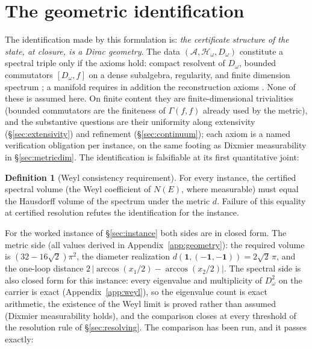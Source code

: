 \documentclass[11pt]{article}
\theoremstyle{definition}
\newtheorem{definition}[theorem]{Definition}
\theoremstyle{remark}
\newcommand{\A}{\mathcal{A}}
\newcommand{\Hw}{\mathcal{H}_{\omega}}
\begin{document}
\section{The geometric identification}\label{sec:geometry}

The identification made by this formulation is: \emph{the certificate
structure of the state, at closure, is a Dirac geometry}.  The data
$(\A, \Hw, D_\omega)$ constitute a spectral triple only if the axioms
hold: compact resolvent of $D_\omega$, bounded commutators $[D_\omega,
f]$ on a dense subalgebra, regularity, and finite dimension spectrum
\cite{connes}; a manifold requires in addition the reconstruction axioms
\cite{connesrecon}.  None of these is assumed here.  On finite content
they are finite-dimensional trivialities (bounded commutators are the
finiteness of $\Gamma(f,f)$ already used by the metric), and the
substantive questions are their uniformity along extensivity
(\S\ref{sec:extensivity}) and refinement (\S\ref{sec:continuum}); each
axiom is a named verification obligation per instance, on the same
footing as Dixmier measurability in \S\ref{sec:metricdim}.  The
identification is falsifiable at its first quantitative joint:

\begin{definition}[Weyl consistency requirement]\label{def:weyl}
For every instance, the certified spectral volume (the Weyl coefficient
of $N(E)$, where measurable) must equal the Hausdorff volume of the
spectrum under the metric $d$.  Failure of this equality at certified
resolution refutes the identification for the instance.
\end{definition}

For the worked instance of \S\ref{sec:instance} both sides are in
closed form.  The metric side (all values derived in
Appendix~\ref{app:geometry}): the required volume is
$(32 - 16\sqrt 2)\pi^2$, the diameter
realization $d(\mathbf 1, (-\mathbf 1,-\mathbf 1)) = 2\sqrt2\,\pi$, and
the one-loop distance $2\,|\arccos(x_1/2) - \arccos(x_2/2)|$.  The
spectral side is also closed form for this instance: every eigenvalue
and multiplicity of $D_\omega^2$ on the carrier is exact
(Appendix~\ref{app:weyl}), so the eigenvalue count is exact arithmetic,
the existence of the Weyl limit is proved rather than assumed (Dixmier
measurability holds), and the comparison closes at every threshold of
the resolution rule of \S\ref{sec:resolving}.  The comparison has been
run, and it passes exactly:
\end{document}
